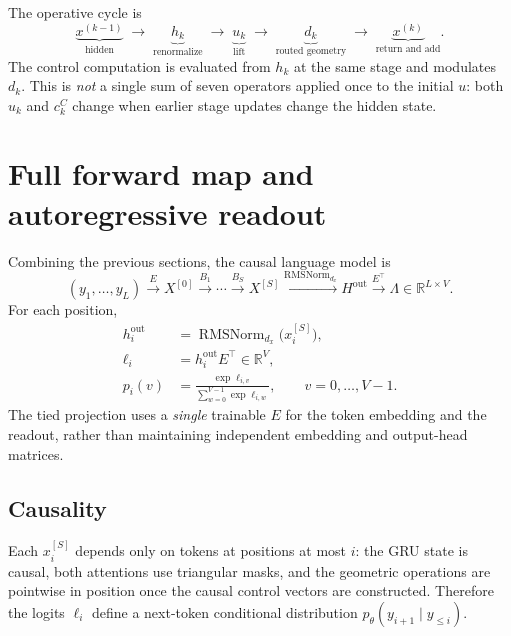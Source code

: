 \documentclass[11pt,a4paper]{article}
\newcommand{\R}{\mathbb{R}}
\newcommand{\rmsn}{\operatorname{RMSNorm}}
\newcommand{\T}{\top}
\begin{document}
The operative cycle is
\begin{equation}
\underbrace{x^{(k-1)}}_{\text{hidden}}\;\longrightarrow\;\underbrace{h_k}_{\text{renormalize}}\;\longrightarrow\;
\underbrace{u_k}_{\text{lift}}\;\longrightarrow\;\underbrace{d_k}_{\text{routed geometry}}\;\longrightarrow\;
\underbrace{x^{(k)}}_{\text{return and add}}.
\end{equation}
The control computation is evaluated from $h_k$ at the same stage and modulates $d_k$. This is \emph{not}
a single sum of seven operators applied once to the initial $u$: both $u_k$ and $c_k^C$ change when earlier
stage updates change the hidden state.

\section{Full forward map and autoregressive readout}

Combining the previous sections, the causal language model is
\begin{equation}
(y_1,\dots,y_L)\xrightarrow{E}X^{[0]}\xrightarrow{B_1}\cdots\xrightarrow{B_S}X^{[S]}
\xrightarrow{\rmsn_{d_x}}H^{\mathrm{out}}\xrightarrow{E^{\T}}\Lambda\in\R^{L\times V}.
\end{equation}
For each position,
\begin{align}
h_i^{\mathrm{out}}&=\rmsn_{d_x}\bigl(x_i^{[S]}\bigr),\\
\ell_i&=h_i^{\mathrm{out}}E^{\T}\in\R^{V},\\
p_i(v)&=\frac{\exp\ell_{i,v}}{\sum_{w=0}^{V-1}\exp\ell_{i,w}},\qquad v=0,\dots,V-1.
\end{align}
The tied projection uses a \emph{single} trainable $E$ for the token embedding and the readout, rather than
maintaining independent embedding and output-head matrices.

\subsection{Causality}

Each $x_i^{[S]}$ depends only on tokens at positions at most $i$: the GRU state is causal, both attentions
use triangular masks, and the geometric operations are pointwise in position once the causal control
vectors are constructed. Therefore the logits $\ell_i$ define a next-token conditional distribution
$p_\theta(y_{i+1}\mid y_{\le i})$.
\end{document}
